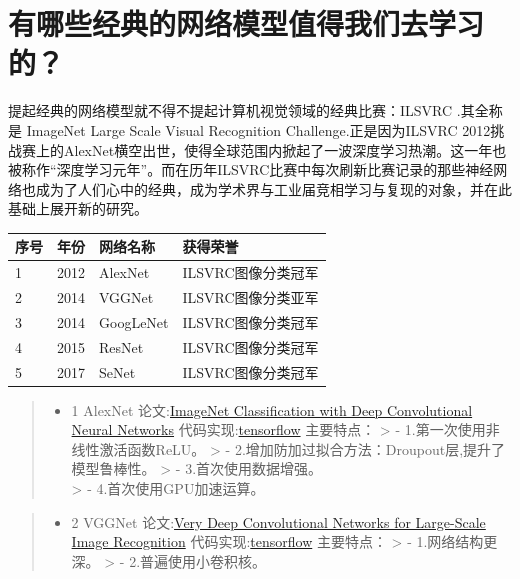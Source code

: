 \section{有哪些经典的网络模型值得我们去学习的？}\label{ux6709ux54eaux4e9bux7ecfux5178ux7684ux7f51ux7edcux6a21ux578bux503cux5f97ux6211ux4eecux53bbux5b66ux4e60ux7684}

提起经典的网络模型就不得不提起计算机视觉领域的经典比赛：ILSVRC .其全称是
ImageNet Large Scale Visual Recognition Challenge.正是因为ILSVRC
2012挑战赛上的AlexNet横空出世，使得全球范围内掀起了一波深度学习热潮。这一年也被称作``深度学习元年''。而在历年ILSVRC比赛中每次刷新比赛记录的那些神经网络也成为了人们心中的经典，成为学术界与工业届竞相学习与复现的对象，并在此基础上展开新的研究。

\begin{longtable}[]{ llll }
\toprule
序号 & 年份 & 网络名称 & 获得荣誉\tabularnewline
\midrule
\endhead
1 & 2012 & AlexNet & ILSVRC图像分类冠军\tabularnewline
2 & 2014 & VGGNet & ILSVRC图像分类亚军\tabularnewline
3 & 2014 & GoogLeNet & ILSVRC图像分类冠军\tabularnewline
4 & 2015 & ResNet & ILSVRC图像分类冠军\tabularnewline
5 & 2017 & SeNet & ILSVRC图像分类冠军\tabularnewline
\bottomrule
\end{longtable}

\begin{quote}
\begin{itemize}
\item
  1 AlexNet
  论文:\href{https://papers.nips.cc/paper/4824-imagenet-classification-with-deep-convolutional-neural-networks.pdf}{ImageNet
  Classification with Deep Convolutional Neural Networks}
  代码实现:\href{https://github.com/tensorflow/tensorflow/blob/361a82d73a50a800510674b3aaa20e4845e56434/tensorflow/contrib/slim/python/slim/nets/alexnet.py}{tensorflow}
  主要特点： \textgreater{} - 1.第一次使用非线性激活函数ReLU。
  \textgreater{} - 2.增加防加过拟合方法：Droupout层,提升了模型鲁棒性。
  \textgreater{} - 3.首次使用数据增强。\\
  \textgreater{} - 4.首次使用GPU加速运算。
\end{itemize}
\end{quote}

\begin{quote}
\begin{itemize}
\item
  2 VGGNet 论文:\href{https://arxiv.org/abs/1409.1556}{Very Deep
  Convolutional Networks for Large-Scale Image Recognition}
  代码实现:\href{https://github.com/tensorflow/tensorflow/blob/361a82d73a50a800510674b3aaa20e4845e56434/tensorflow/contrib/slim/python/slim/nets/vgg.py}{tensorflow}
  主要特点： \textgreater{} - 1.网络结构更深。 \textgreater{} -
  2.普遍使用小卷积核。
\end{itemize}
\end{quote}

